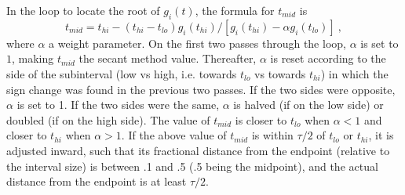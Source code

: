 In the loop to locate the root of $g_i(t)$, the formula for $t_{mid}$
is
\[ t_{mid} = t_{hi} - (t_{hi} - t_{lo})
               g_i(t_{hi}) / [g_i(t_{hi}) - \alpha g_i(t_{lo})] ~, \] 
where $\alpha$ a weight parameter.  On the first two passes through
the loop, $\alpha$ is set to $1$, making $t_{mid}$ the secant method
value.  Thereafter, $\alpha$ is reset according to the side of the
subinterval (low vs high, i.e. towards $t_{lo}$ vs towards $t_{hi}$)
in which the sign change was found in the previous two passes.  If the
two sides were opposite, $\alpha$ is set to 1.  If the two sides were
the same, $\alpha$ is halved (if on the low side) or doubled (if on
the high side).  The value of $t_{mid}$ is closer to $t_{lo}$ when
$\alpha < 1$ and closer to $t_{hi}$ when $\alpha > 1$.  If the above
value of $t_{mid}$ is within $\tau/2$ of $t_{lo}$ or $t_{hi}$, it is
adjusted inward, such that its fractional distance from the endpoint
(relative to the interval size) is between .1 and .5 (.5 being the
midpoint), and the actual distance from the endpoint is at least
$\tau/2$.
